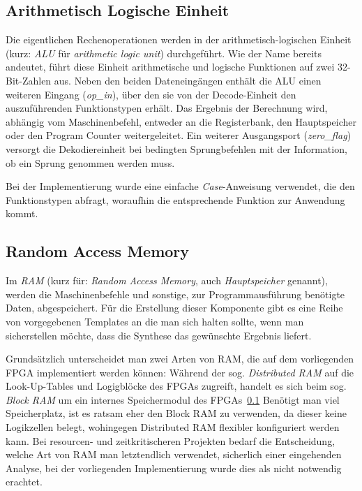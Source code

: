 \subsection{Arithmetisch Logische Einheit}

Die eigentlichen Rechenoperationen werden in der arithmetisch-logischen Einheit (kurz: \textit{ALU} für \textit{arithmetic logic unit}) durchgeführt.
Wie der Name bereits andeutet, führt diese Einheit arithmetische und logische Funktionen auf zwei 32-Bit-Zahlen aus.
Neben den beiden Dateneingängen enthält die ALU einen weiteren Eingang (\textit{op\_in}), über den sie von der Decode-Einheit den auszuführenden Funktionstypen erhält.
Das Ergebnis der Berechnung wird, abhängig vom Maschinenbefehl, entweder an die Registerbank, den Hauptspeicher oder den Program Counter weitergeleitet.
Ein weiterer Ausgangsport (\textit{zero\_flag}) versorgt die Dekodiereinheit bei bedingten Sprungbefehlen mit der Information, ob ein Sprung genommen werden muss. 

Bei der Implementierung wurde eine einfache \textit{Case}-Anweisung verwendet, die den Funktionstypen abfragt, woraufhin die entsprechende Funktion zur Anwendung kommt.

\subsection{Random Access Memory}
\label{subsec:RAM}

Im \textit{RAM} (kurz für: \textit{Random Access Memory}, auch \textit{Hauptspeicher} genannt), werden die Maschinenbefehle und sonstige, zur Programmausführung benötigte Daten, abgespeichert.
Für die Erstellung dieser Komponente gibt es eine Reihe von vorgegebenen Templates an die man sich halten sollte, wenn man sicherstellen möchte, dass die Synthese das gewünschte Ergebnis liefert.~\cite[S. 243 ff.]{Chu}

Grundsätzlich unterscheidet man zwei Arten von RAM, die auf dem vorliegenden FPGA implementiert werden können:
Während der sog. \textit{Distributed RAM} auf die Look-Up-Tables und Logigblöcke des FPGAs zugreift, handelt es sich beim sog. \textit{Block RAM} um ein internes Speichermodul des FPGAs~\ref{}
Benötigt man viel Speicherplatz, ist es ratsam eher den Block RAM zu verwenden, da dieser keine Logikzellen belegt, wohingegen Distributed RAM flexibler konfiguriert werden kann.
Bei resourcen- und zeitkritischeren Projekten bedarf die Entscheidung, welche Art von RAM man letztendlich verwendet, sicherlich einer eingehenden Analyse, bei der vorliegenden Implementierung wurde dies als nicht notwendig erachtet.



